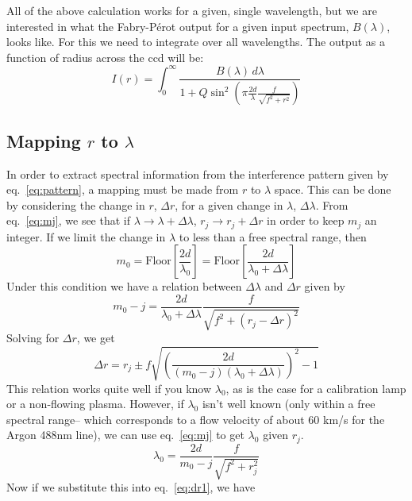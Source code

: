 \documentclass{article}
\begin{document}
All of the above calculation works for a given, single wavelength, but we are interested in what the Fabry-P\'{e}rot output for a given input spectrum, $B(\lambda)$, looks like. For this we need to integrate over all wavelengths. The output as a function of radius across the ccd will be:
\begin{equation}
I(r) = \int_{0}^{\infty} \frac{B(\lambda)\,d\lambda}{1+Q\sin^{2}{\left(\pi \frac{2d}{\lambda}\frac{f}{\sqrt{f^{2}+r^{2}}}\right)}}
\label{eq:pattern}
\end{equation}

\subsection{Mapping $r$ to $\lambda$}
In order to extract spectral information from the interference pattern given by eq.~\ref{eq:pattern}, a mapping must be made from $r$ to $\lambda$ space. This can be done by considering the change in $r$, $\Delta r$, for a given change in $\lambda$, $\Delta\lambda$. From eq.~\ref{eq:mj}, we see that if $\lambda\rightarrow\lambda+\Delta\lambda$, $r_{j}\rightarrow r_{j}+\Delta r$ in order to keep $m_{j}$ an integer. If we limit the change in $\lambda$ to less than a free spectral range, then
\begin{equation}
m_{0}=\text{Floor}\left[\frac{2d}{\lambda_{0}}\right]=\text{Floor}\left[\frac{2d}{\lambda_{0}+\Delta\lambda}\right]
\end{equation}
Under this condition we have a relation between $\Delta\lambda$ and $\Delta r$ given by
\begin{equation}
m_{0}-j = \frac{2d}{\lambda_{0}+\Delta\lambda}\frac{f}{\sqrt{f^{2}+(r_{j}-\Delta r)^{2}}}
\end{equation}
Solving for $\Delta r$, we get
\begin{equation}
\Delta r = r_{j} \pm f \sqrt{\left(\frac{2d}{(m_{0}-j)(\lambda_{0}+\Delta\lambda)}\right)^{2}-1}
\label{eq:dr1}
\end{equation}
This relation works quite well if you know $\lambda_{0}$, as is the case for a calibration lamp or a non-flowing plasma. However, if $\lambda_{0}$ isn't well known (only within a free spectral range-- which corresponds to a flow velocity of about 60 km/s for the Argon 488nm line), we can use eq.~\ref{eq:mj} to get $\lambda_{0}$ given $r_{j}$.
\begin{equation}
\lambda_{0}=\frac{2d}{m_{0}-j}\frac{f}{\sqrt{f^{2}+r_{j}^{2}}}
\label{eq:lam_sub}
\end{equation}
Now if we substitute this into eq.~\ref{eq:dr1}, we have
\end{document}
